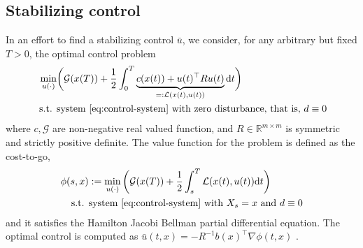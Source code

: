 \documentclass[10pt,a4paper]{amsart}
\newtheorem{remark}{Remark}
\newcommand{\tp}{^\top}
\newcommand{\inv}{^{-1}}
\newcommand{\R}{\mathbb{R}}
\newcommand{\half}{\frac{1}{2}}
\newcommand{\ud}{\mathrm{d}}
\newcommand{\G}{\mathcal{G}}
\newcommand{\grad}{\nabla}
\renewcommand{\L}{\mathcal{L}}
\begin{document}
\subsection{Stabilizing control}
In an effort to find a stabilizing control $\bar{u}$, we consider, for any arbitrary but fixed $T > 0$, the optimal control problem
\begin{subequations}\label{eq:nLQR}
\begin{align}
\min_{u(\cdot)} & \bigg( \mathcal{G}(x(T)) + \half \int_{0}^{T} \underbrace{c(x(t)) + u(t)\tp R u(t)}_{=: \L(x(t),u(t))} \ud t \bigg) \\
\text{ s.t. } & \text{system }\eqref{eq:control-system} \text{ with zero disturbance, that is, } d \equiv 0
\end{align}
\end{subequations}
where $c,\G$ are non-negative real valued function, and $R \in \R^{m \times m}$ is symmetric and strictly positive definite. The value function for the problem is defined as the cost-to-go,
\begin{align*}
    \phi(s,x) &:= \min_{u(\cdot)}  \bigg( \mathcal{G}(x(T)) + \half \int_{s}^{T} \L(x(t),u(t)) \ud t \bigg) \\
\text{ s.t. } & \text{system }\eqref{eq:control-system} \text{ with } X_s = x \text{ and } d \equiv 0
\end{align*}
and it satisfies the Hamilton Jacobi Bellman partial differential equation. The optimal control is computed as $\bar{u}(t,x) = -R\inv b(x)\tp \grad \phi(t,x)$ \cite{liberzon}. 
\end{document}
